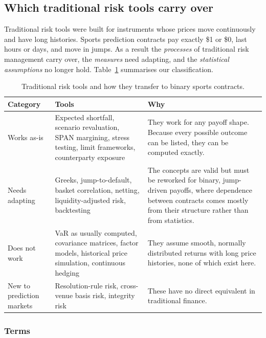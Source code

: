\documentclass[11pt]{article}
\begin{document}
\subsection{Which traditional risk tools carry over}\label{sec:tools}


Traditional risk tools were built for instruments whose prices move continuously and have long histories. Sports prediction contracts pay exactly \$1 or \$0, last hours or days, and move in jumps. As a result the \emph{processes} of traditional risk management carry over, the \emph{measures} need adapting, and the \emph{statistical assumptions} no longer hold. Table~\ref{tab:tools} summarises our classification.

\begin{table}[H]
\centering
\small
\begin{tabular}{p{2.5cm}p{5.0cm}p{7.6cm}}
\toprule
\textbf{Category} & \textbf{Tools} & \textbf{Why} \\
\midrule
Works as-is & Expected shortfall, scenario revaluation, SPAN margining, stress testing, limit frameworks, counterparty exposure & They work for any payoff shape. Because every possible outcome can be listed, they can be computed exactly. \\
Needs adapting & Greeks, jump-to-default, basket correlation, netting, liquidity-adjusted risk, backtesting & The concepts are valid but must be reworked for binary, jump-driven payoffs, where dependence between contracts comes mostly from their structure rather than from statistics. \\
Does not work & VaR as usually computed, covariance matrices, factor models, historical price simulation, continuous hedging & They assume smooth, normally distributed returns with long price histories, none of which exist here. \\
New to prediction markets & Resolution-rule risk, cross-venue basis risk, integrity risk & These have no direct equivalent in traditional finance. \\
\bottomrule
\end{tabular}
\caption{Traditional risk tools and how they transfer to binary sports contracts.}
\label{tab:tools}
\end{table}

\subsubsection{Terms}
\end{document}

